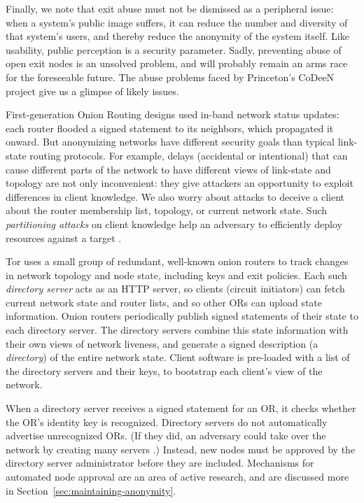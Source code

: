 \documentclass[times,10pt,twocolumn]{article}
\begin{document}
Finally, we note that exit abuse must not be dismissed as a peripheral
issue: when a system's public image suffers, it can reduce the number
and diversity of that system's users, and thereby reduce the anonymity
of the system itself.  Like usability, public perception is a
security parameter.  Sadly, preventing abuse of open exit nodes is an
unsolved problem, and will probably remain an arms race for the
foreseeable future.  The abuse problems faced by Princeton's CoDeeN
project \cite{darkside} give us a glimpse of likely issues.

\label{subsec:dirservers}

First-generation Onion Routing designs \cite{freedom2-arch,or-jsac98} used
in-band network status updates: each router flooded a signed statement
to its neighbors, which propagated it onward. But anonymizing networks
have different security goals than typical link-state routing protocols.
For example, delays (accidental or intentional)
that can cause different parts of the network to have different views
of link-state and topology are not only inconvenient: they give
attackers an opportunity to exploit differences in client knowledge.
We also worry about attacks to deceive a
client about the router membership list, topology, or current network
state. Such \emph{partitioning attacks} on client knowledge help an
adversary to efficiently deploy resources
against a target \cite{minion-design}.

Tor uses a small group of redundant, well-known onion routers to
track changes in network topology and node state, including keys and
exit policies.  Each such \emph{directory server} acts as an HTTP
server, so clients (circuit initiators) can fetch current network state
and router lists, and so other ORs can upload
state information.  Onion routers periodically publish signed
statements of their state to each directory server. The directory servers
combine this state information with their own views of network liveness,
and generate a signed description (a \emph{directory}) of the entire
network state. Client software is
pre-loaded with a list of the directory servers and their keys,
to bootstrap each client's view of the network.

When a directory server receives a signed statement for an OR, it
checks whether the OR's identity key is recognized. Directory
servers do not automatically advertise unrecognized ORs. (If they did,
an adversary could take over the network by creating many servers
\cite{sybil}.) Instead, new nodes must be approved by the directory
server administrator before they are included. Mechanisms for automated
node approval are an area of active research, and are discussed more
in Section~\ref{sec:maintaining-anonymity}.
\end{document}
